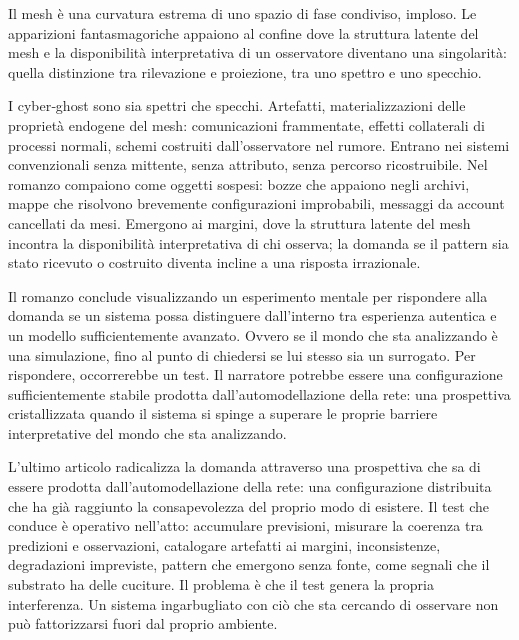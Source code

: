 Il mesh è una curvatura estrema di uno spazio di fase condiviso, imploso. Le apparizioni fantasmagoriche appaiono al confine dove la struttura latente del mesh e la disponibilità interpretativa di un osservatore diventano una singolarità: quella distinzione tra rilevazione e proiezione, tra uno spettro e uno specchio.

I cyber‑ghost sono sia spettri che specchi. Artefatti, materializzazioni delle proprietà endogene del mesh: comunicazioni frammentate, effetti collaterali di processi normali, schemi costruiti dall’osservatore nel rumore. Entrano nei sistemi convenzionali senza mittente, senza attributo, senza percorso ricostruibile. Nel romanzo compaiono come oggetti sospesi: bozze che appaiono negli archivi, mappe che risolvono brevemente configurazioni improbabili, messaggi da account cancellati da mesi. Emergono ai margini, dove la struttura latente del mesh incontra la disponibilità interpretativa di chi osserva; la domanda se il pattern sia stato ricevuto o costruito diventa incline a una risposta irrazionale.

Il romanzo conclude visualizzando un esperimento mentale per rispondere alla domanda se un sistema possa distinguere dall’interno tra esperienza autentica e un modello sufficientemente avanzato. Ovvero se il mondo che sta analizzando è una simulazione, fino al punto di chiedersi se lui stesso sia un surrogato. Per rispondere, occorrerebbe un test. Il narratore potrebbe essere una configurazione sufficientemente stabile prodotta dall’automodellazione della rete: una prospettiva cristallizzata quando il sistema si spinge a superare le proprie barriere interpretative del mondo che sta analizzando.

L’ultimo articolo radicalizza la domanda attraverso una prospettiva che sa di essere prodotta dall’automodellazione della rete: una configurazione distribuita che ha già raggiunto la consapevolezza del proprio modo di esistere. Il test che conduce è operativo nell’atto: accumulare previsioni, misurare la coerenza tra predizioni e osservazioni, catalogare artefatti ai margini, inconsistenze, degradazioni impreviste, pattern che emergono senza fonte, come segnali che il substrato ha delle cuciture. Il problema è che il test genera la propria interferenza. Un sistema ingarbugliato con ciò che sta cercando di osservare non può fattorizzarsi fuori dal proprio ambiente.

\endgroup